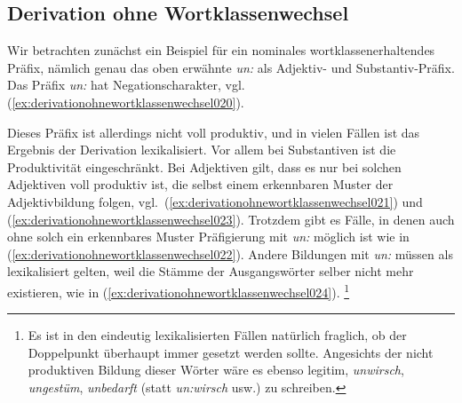 \subsection{Derivation ohne Wortklassenwechsel}
\label{sec:derivationohnewortklassenwechsel}


Wir betrachten zunächst ein Beispiel für ein nominales wortklassenerhaltendes Präfix, nämlich genau das oben erwähnte \textit{un:} als Adjektiv- und Substantiv-Präfix.
Das Präfix \textit{un:} hat Negationscharakter, vgl. (\ref{ex:derivationohnewortklassenwechsel020}).

\begin{exe}
  \ex\label{ex:derivationohnewortklassenwechsel020}
  \begin{xlist}
  \end{xlist}
\end{exe}

Dieses Präfix ist allerdings nicht voll produktiv, und in vielen Fällen ist das Ergebnis der Derivation lexikalisiert.
Vor allem bei Substantiven ist die Produktivität eingeschränkt.
Bei Adjektiven gilt, dass es nur bei solchen Adjektiven voll produktiv ist, die selbst einem erkennbaren Muster der Adjektivbildung folgen, vgl.\ (\ref{ex:derivationohnewortklassenwechsel021}) und (\ref{ex:derivationohnewortklassenwechsel023}).
Trotzdem gibt es Fälle, in denen auch ohne solch ein erkennbares Muster Präfigierung mit \textit{un:} möglich ist wie in (\ref{ex:derivationohnewortklassenwechsel022}).
Andere Bildungen mit \textit{un:} müssen als lexikalisiert gelten, weil die Stämme der Ausgangswörter selber nicht mehr existieren, wie in (\ref{ex:derivationohnewortklassenwechsel024}).%
\footnote{Es ist in den eindeutig lexikalisierten Fällen natürlich fraglich, ob der Doppelpunkt überhaupt immer gesetzt werden sollte.
Angesichts der nicht produktiven Bildung dieser Wörter wäre es ebenso legitim, \textit{unwirsch}, \textit{ungestüm}, \textit{unbedarft} (statt \textit{un:wirsch} usw.) zu schreiben.}

\begin{exe}
  \ex\label{ex:derivationohnewortklassenwechsel021}
    \begin{xlist}
  \end{xlist}
  \ex\label{ex:derivationohnewortklassenwechsel023}
  \begin{xlist}
  \end{xlist}
  \ex\label{ex:derivationohnewortklassenwechsel024}
  \begin{xlist}
  \end{xlist}
\end{exe}

